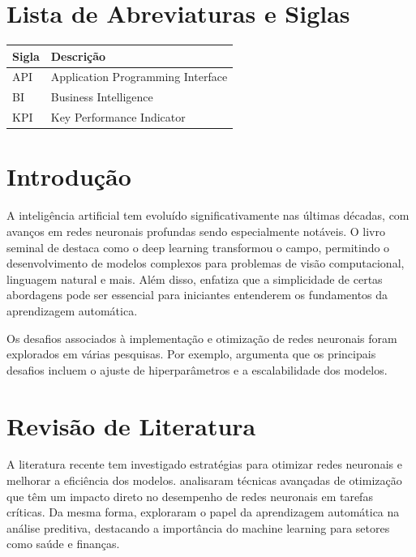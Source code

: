 \documentclass[a4paper,12pt]{report}
\begin{document}
	\chapter*{Lista de Abreviaturas e Siglas}
	\begin{longtable}{p{3cm} p{10cm}}
		\textbf{Sigla} & \textbf{Descrição} \\
		\hline
		API & Application Programming Interface \\
		BI & Business Intelligence \\
		KPI & Key Performance Indicator \\
	\end{longtable}
	
	\newpage
	
	\chapter{Introdução}
	A inteligência artificial tem evoluído significativamente nas últimas décadas, com avanços em redes neuronais profundas sendo especialmente notáveis. O livro seminal de \citet{goodfellow2016} destaca como o deep learning transformou o campo, permitindo o desenvolvimento de modelos complexos para problemas de visão computacional, linguagem natural e mais. Além disso, \citet{taylor2015} enfatiza que a simplicidade de certas abordagens pode ser essencial para iniciantes entenderem os fundamentos da aprendizagem automática. 
	
	Os desafios associados à implementação e otimização de redes neuronais foram explorados em várias pesquisas. Por exemplo, \citet{rao2019} argumenta que os principais desafios incluem o ajuste de hiperparâmetros e a escalabilidade dos modelos.
	
	\chapter{Revisão de Literatura}
	A literatura recente tem investigado estratégias para otimizar redes neuronais e melhorar a eficiência dos modelos. \citet{smith2021optimization} analisaram técnicas avançadas de otimização que têm um impacto direto no desempenho de redes neuronais em tarefas críticas. Da mesma forma, \citet{brown2020} exploraram o papel da aprendizagem automática na análise preditiva, destacando a importância do machine learning para setores como saúde e finanças.
	
\end{document}
